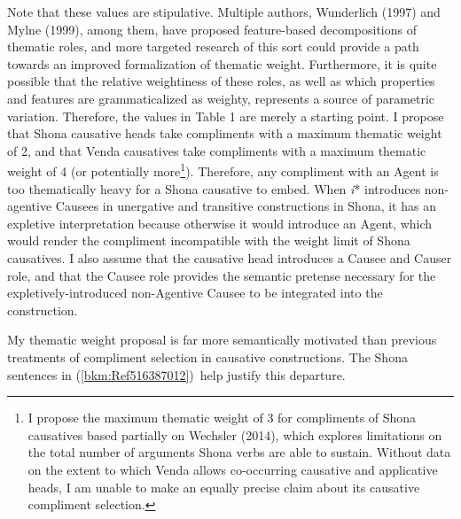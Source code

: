 \documentclass[12pt]{article}
\newenvironment{styleDefault}{\renewcommand\baselinestretch{1.0}\setlength\leftskip{0cm}\setlength\rightskip{0cm plus 1fil}\setlength\parindent{0cm}\setlength\parfillskip{0pt plus 1fil}\setlength\parskip{0in plus 1pt}\writerlistparindent\writerlistleftskip\leavevmode\normalfont\normalsize\writerlistlabel\ignorespaces}{\unskip\vspace{0in plus 1pt}\par}
\newcommand\writerlistleftskip{}
\newcommand\writerlistparindent{}
\newcommand\writerlistlabel{}
\begin{document}
\begin{styleDefault}
Note that these values are stipulative. Multiple authors, Wunderlich (1997) and Mylne (1999), among them, have proposed feature-based decompositions of thematic roles, and more targeted research of this sort could provide a path towards an improved formalization of thematic weight. Furthermore, it is quite possible that the relative weightiness of these roles, as well as which properties and features are grammaticalized as weighty, represents a source of parametric variation. Therefore, the values in Table 1 are merely a starting point.\newline
\newline
I propose that Shona causative heads take compliments with a maximum thematic weight of 2, and that Venda causatives take compliments with a maximum thematic weight of 4 (or potentially more\footnote{ I propose the maximum thematic weight of 3 for compliments of Shona causatives based partially on Wechsler (2014), which explores limitations on the total number of arguments Shona verbs are able to sustain. Without data on the extent to which Venda allows co-occurring causative and applicative heads, I am unable to make an equally precise claim about its causative compliment selection. }). Therefore, any compliment with an Agent is too thematically heavy for a Shona causative to embed. When \textit{i}* introduces non-agentive Causees in unergative and transitive constructions in Shona, it has an expletive interpretation because otherwise it would introduce an Agent, which would render the compliment incompatible with the weight limit of Shona causatives. I also assume that the causative head introduces a Causee and Causer role, and that the Causee role provides the semantic pretense necessary for the expletively-introduced non-Agentive Causee to be integrated into the construction. 
\end{styleDefault}

\begin{styleDefault}
My thematic weight proposal is far more semantically motivated than previous treatments of compliment selection in causative constructions. The Shona sentences in (\ref{bkm:Ref516387012})\ help justify this departure.
\end{styleDefault}
\end{document}
